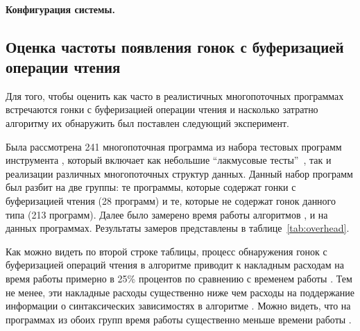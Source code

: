 \paragraph{Конфигурация системы.} 
\TODO{}

\subsection*{Оценка частоты появления гонок с буферизацией операции чтения}

Для того, чтобы оценить как часто в реалистичных многопоточных
программах встречаются гонки с буферизацией операции чтения
и насколько затратно алгоритму \wmc их обнаружить 
был поставлен следующий эксперимент.


Была рассмотрена 241 многопоточная программа 
из набора тестовых программ инструмента \genmc, 
который включает как небольшие ``лакмусовые тесты''~\cite{Alglave-al:TACAS2011}, 
так и реализации различных многопоточных структур данных.
Данный набор программ был разбит на две группы:
те программы, которые содержат гонки с буферизацией чтения (28 программ)
и те, которые не содержат гонок данного типа (213 программ).
Далее было замерено время работы алгоритмов \genmc, \hmc и \wmc на данных программах.  
Результаты замеров представлены в таблице~\ref{tab:overhead}.



Как можно видеть по второй строке таблицы, 
процесс обнаружения гонок с буферизацией операций чтения 
в алгоритме \wmc приводит к накладным расходам на время работы 
примерно в 25\% процентов по сравнению с временем работы \genmc.
Тем не менее, эти накладные расходы существенно ниже чем 
расходы на поддержание информации о синтаксических зависимостях
в алгоритме \hmc. Можно видеть, что на программах из обоих групп
время работы \wmc существенно меньше времени работы \hmc. 

